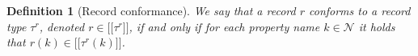 \documentclass[a4paper]{article}
\newtheorem{definition}[theorem]{Definition}
\newcommand{\rtype}{\tau^r}
\newcommand{\lsem}{\ensuremath{[\![}}
\newcommand{\rsem}{\ensuremath{]\!]}}
\newcommand{\sem}[1]{\ensuremath{\lsem #1 \rsem}}
\begin{document}
\begin{definition}[Record conformance]
  We say that a record $r$ \emph{conforms} to a record type $\rtype$, denoted $r \in \sem{\rtype}$, if and only if for each property name $k \in \mathcal{N}$ it holds that $r(k) \in \sem{\rtype(k)}$.
\end{definition}


\end{document}
